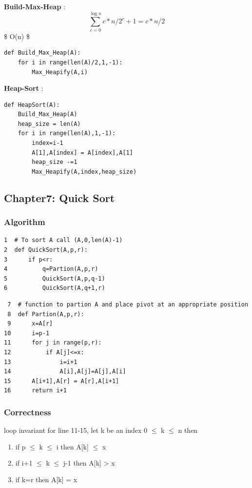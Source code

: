 \documentclass[11pt]{article}
\begin{document}
\textbf{Build-Max-Heap} : 
$$ \sum_{c=0}^{\log n} c*n/2^c+1 = c*n / 2 $$
\implies \$ O(n) \$
\begin{verbatim}
def Build_Max_Heap(A):
    for i in range(len(A)/2,1,-1):
        Max_Heapify(A,i)
\end{verbatim}

\textbf{Heap-Sort} :
\begin{verbatim}
def HeapSort(A):
    Build_Max_Heap(A)
    heap_size = len(A)
    for i in range(len(A),1,-1):
        index=i-1
        A[1],A[index] = A[index],A[1]
        heap_size -=1
        Max_Heapify(A,index,heap_size)
\end{verbatim}

\subsection{Chapter7: Quick Sort}
\label{sec:org92a7881}
\subsubsection{Algorithm}
\label{sec:org0d309ac}
\begin{verbatim}
1  # To sort A call (A,0,len(A)-1)
2  def QuickSort(A,p,r):
3      if p<r:
4          q=Partion(A,p,r)
5          QuickSort(A,p,q-1)
6          QuickSort(A,q+1,r)
\end{verbatim}

\begin{verbatim}
 7  # function to partion A and place pivot at an appropriate position
 8  def Partion(A,p,r):
 9      x=A[r]
10      i=p-1
11      for j in range(p,r):
12          if A[j]<=x:
13              i=i+1
14              A[i],A[j]=A[j],A[i]
15      A[i+1],A[r] = A[r],A[i+1]
16      return i+1
\end{verbatim}

\subsubsection{Correctness}
\label{sec:orgd682bef}
loop invariant for line 11-15, let k be an index 0 \(\le\) k \(\le\) n then
\begin{enumerate}
\item if p \(\le\) k \(\le\) i then A[k] \(\le\) x
\item if i+1 \(\le\) k \(\le\) j-1 then A[k] > x
\item if k=r then A[k] = x \\
\end{enumerate}
\end{document}
